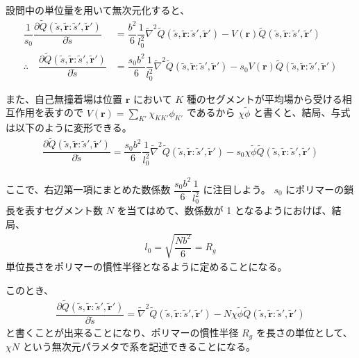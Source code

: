 \documentclass[uplatex,dvipdfmx,a4paper,11pt]{jsarticle}
\newcommand{\difp}[2]{\dfrac{\partial #1}{\partial #2}}
\begin{document}
\begin{enumerate}
設問中の単位量を用いて無次元化すると、
\begin{align*}
\dfrac{1}{s_0} \difp{\tilde{Q}(\tilde{s}, \tilde{\bm{r}}: \tilde{s}', \tilde{\bm{r}}')}{\tilde{s}} &= \dfrac{b^2}{6} \dfrac{1}{l_0^2} \tilde{\nabla}^2 \tilde{Q}(\tilde{s}, \tilde{\bm{r}}: \tilde{s}', \tilde{\bm{r}}') - V(\bm{r}) \tilde{Q}(\tilde{s}, \tilde{\bm{r}}: \tilde{s}', \tilde{\bm{r}}') \\
\therefore \quad \difp{\tilde{Q}(\tilde{s}, \tilde{\bm{r}}: \tilde{s}', \tilde{\bm{r}}')}{\tilde{s}} &= \dfrac{s_0 b^2}{6} \dfrac{1}{l_0^2} \tilde{\nabla}^2 \tilde{Q}(\tilde{s}, \tilde{\bm{r}}: \tilde{s}', \tilde{\bm{r}}') - s_0 V(\bm{r}) \tilde{Q}(\tilde{s}, \tilde{\bm{r}}: \tilde{s}', \tilde{\bm{r}}')
\end{align*}

また、自己無撞着場は位置 $\bm{r}$ において $K$ 種のセグメントが平均場から受ける相互作用を表すので $\displaystyle V(\bm{r}) = \sum_{K'} \chi_{K K'} \phi_{K'}$ であるから $\chi \tilde{\phi}$ と書くと、結局、与式は以下のように変形できる。
\begin{align*}
\difp{\tilde{Q}(\tilde{s}, \tilde{\bm{r}}: \tilde{s}', \tilde{\bm{r}}')}{\tilde{s}} = \dfrac{s_0 b^2}{6} \dfrac{1}{l_0^2} \tilde{\nabla}^2 \tilde{Q}(\tilde{s}, \tilde{\bm{r}}: \tilde{s}', \tilde{\bm{r}}') - s_0 \chi \tilde{\phi} \tilde{Q}(\tilde{s}, \tilde{\bm{r}}: \tilde{s}', \tilde{\bm{r}}')
\end{align*}

ここで、右辺第一項にまとめた数係数 $\dfrac{s_0 b^2}{6} \dfrac{1}{l_0^2} $ に注目しよう。
$s_0$ にポリマーの鎖長を表すセグメント数 $N$ を当てはめて、数係数が 1 となるようにおけば、結局、
\begin{align*}
l_0 = \sqrt{\dfrac{N b^2}{6}} = R_g
\end{align*}
単位長さをポリマーの慣性半径となるように定めることになる。

このとき、
\begin{align*}
\difp{\tilde{Q}(\tilde{s}, \tilde{\bm{r}}: \tilde{s}', \tilde{\bm{r}}')}{\tilde{s}} = \tilde{\nabla}^2 \tilde{Q}(\tilde{s}, \tilde{\bm{r}}: \tilde{s}', \tilde{\bm{r}}') - N \chi \tilde{\phi} \tilde{Q}(\tilde{s}, \tilde{\bm{r}}: \tilde{s}', \tilde{\bm{r}}')
\end{align*}
と書くことが出来ることになり、ポリマーの慣性半径 $R_g$ を長さの単位として、$\chi N$ という無次元パラメタで系を記述できることになる。 


\color{black}

\end{enumerate}
\end{document}
